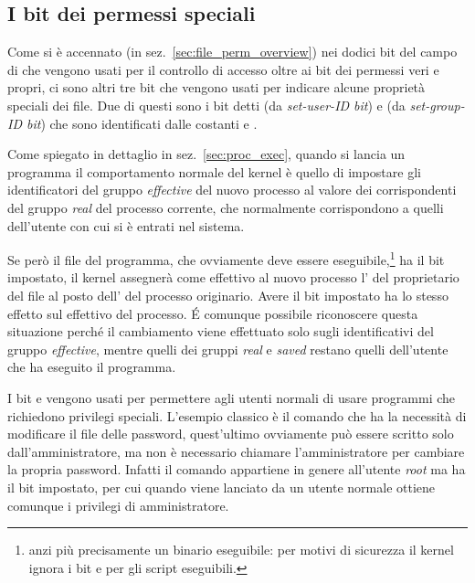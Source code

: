 \subsection{I bit dei permessi speciali}
\label{sec:file_special_perm}


Come si è accennato (in sez.~\ref{sec:file_perm_overview}) nei dodici bit del
campo  di  che vengono usati per il controllo di
accesso oltre ai bit dei permessi veri e propri, ci sono altri tre bit che
vengono usati per indicare alcune proprietà speciali dei file.  Due di questi
sono i bit detti  (da \textit{set-user-ID bit}) e  (da
\textit{set-group-ID bit}) che sono identificati dalle costanti
 e .

Come spiegato in dettaglio in sez.~\ref{sec:proc_exec}, quando si lancia un
programma il comportamento normale del kernel è quello di impostare gli
identificatori del gruppo \textit{effective} del nuovo processo al valore dei
corrispondenti del gruppo \textit{real} del processo corrente, che normalmente
corrispondono a quelli dell'utente con cui si è entrati nel sistema.

Se però il file del programma, che ovviamente deve essere
eseguibile,\footnote{anzi più precisamente un binario eseguibile: per motivi
  di sicurezza il kernel ignora i bit  e  per gli script
  eseguibili.} ha il bit  impostato, il kernel assegnerà come
 effettivo al nuovo processo l' del proprietario del file al
posto dell' del processo originario.  Avere il bit 
impostato ha lo stesso effetto sul  effettivo del processo. É
comunque possibile riconoscere questa situazione perché il cambiamento viene
effettuato solo sugli identificativi del gruppo \textit{effective}, mentre
quelli dei gruppi \textit{real} e \textit{saved} restano quelli dell'utente
che ha eseguito il programma.

I bit  e  vengono usati per permettere agli utenti normali
di usare programmi che richiedono privilegi speciali. L'esempio classico è il
comando  che ha la necessità di modificare il file delle password,
quest'ultimo ovviamente può essere scritto solo dall'amministratore, ma non è
necessario chiamare l'amministratore per cambiare la propria password. Infatti
il comando  appartiene in genere all'utente \textit{root} ma ha il
bit  impostato, per cui quando viene lanciato da un utente normale
ottiene comunque  i privilegi di amministratore.

